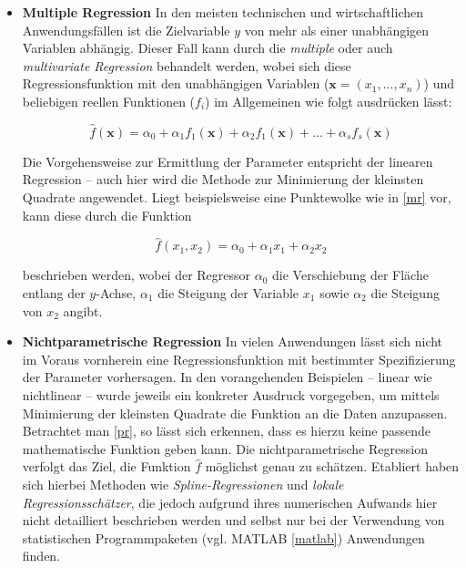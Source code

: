 \begin{itemize}




\item \textbf{Multiple Regression}\enlargethispage{\baselineskip} 
In den meisten technischen und wirtschaftlichen Anwendungsfällen ist die Zielvariable $y$ von mehr als einer unabhängigen Variablen abhängig. Dieser Fall kann durch die \textit{multiple} oder auch \textit{multivariate Regression} behandelt werden, wobei sich diese Regressionsfunktion mit den unabhängigen Variablen ($\boldsymbol{x} = (x_1,...,x_n)$) und beliebigen reellen Funktionen ($f_i$) im Allgemeinen wie folgt ausdrücken lässt:

\begin{equation}
	\hat{f}(\boldsymbol{x}) = \alpha_0 + \alpha_1 f_1(\boldsymbol{x}) + \alpha_2 f_1(\boldsymbol{x}) + ... + \alpha_s f_s(\boldsymbol{x}) 
\end{equation}

Die Vorgehensweise zur Ermittlung der Parameter entspricht der linearen Regression -- auch hier wird die Methode zur Minimierung der kleinsten Quadrate angewendet. Liegt beispielsweise eine Punktewolke wie in \vref{mr} vor, kann diese durch die Funktion

\begin{equation}
	\hat{f}(x_1,x_2) = \alpha_0 + \alpha_1 x_1 + \alpha_2 x_2
\end{equation}

beschrieben werden, wobei der Regressor $\alpha_0$ die Verschiebung der Fläche entlang der $y$-Achse, $\alpha_1$ die Steigung der Variable $x_1$ sowie $\alpha_2$ die Steigung von $x_2$ angibt. 




\item \textbf{Nichtparametrische Regression}
In vielen Anwendungen lässt sich nicht im Voraus vornherein eine Regressionsfunktion mit bestimmter Spezifizierung der Parameter vorhersagen. In den vorangehenden Beispielen -- linear wie nichtlinear -- wurde jeweils ein konkreter Ausdruck vorgegeben, um mittels Minimierung der kleinsten Quadrate die Funktion an die Daten anzupassen. Betrachtet man \vref{pr}, so lässt sich erkennen, dass es hierzu keine passende mathematische Funktion geben kann. Die nichtparametrische Regression verfolgt das Ziel, die Funktion $\hat{f}$ möglichst genau zu schätzen. Etabliert haben sich hierbei Methoden wie \textit{Spline-Regressionen} und \textit{lokale Regressionsschätzer}, die jedoch aufgrund ihres numerischen Aufwands hier nicht detailliert beschrieben werden und selbst nur bei der Verwendung von statistischen Programmpaketen (vgl. MATLAB \vref{matlab}) Anwendungen finden.


\end{itemize}
